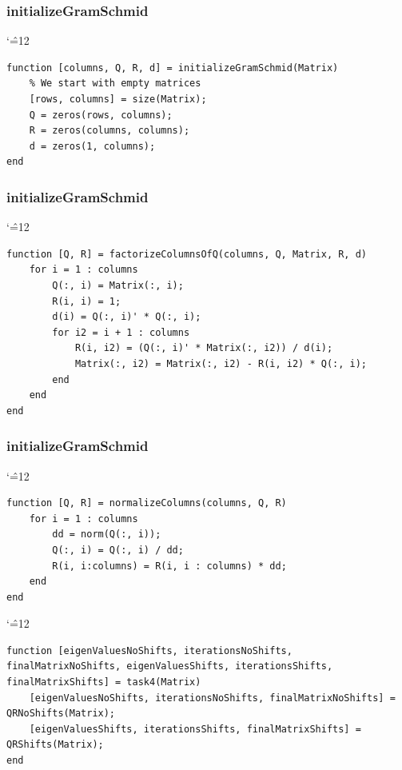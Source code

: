 \documentclass[12pt]{report}
\newenvironment{simplechar}{%
   \catcode`\^=12
}{}
\begin{document}
\subsubsection{initializeGramSchmid}
\begin{simplechar}
\begin{lstlisting}
function [columns, Q, R, d] = initializeGramSchmid(Matrix)
    % We start with empty matrices
    [rows, columns] = size(Matrix);
    Q = zeros(rows, columns);
    R = zeros(columns, columns);
    d = zeros(1, columns);
end
\end{lstlisting}
\end{simplechar}

\subsubsection{initializeGramSchmid}
\begin{simplechar}
\begin{lstlisting}
function [Q, R] = factorizeColumnsOfQ(columns, Q, Matrix, R, d)
    for i = 1 : columns
        Q(:, i) = Matrix(:, i);
        R(i, i) = 1;
        d(i) = Q(:, i)' * Q(:, i);
        for i2 = i + 1 : columns
            R(i, i2) = (Q(:, i)' * Matrix(:, i2)) / d(i);
            Matrix(:, i2) = Matrix(:, i2) - R(i, i2) * Q(:, i);
        end
    end
end
\end{lstlisting}
\end{simplechar}

\subsubsection{initializeGramSchmid}
\begin{simplechar}
\begin{lstlisting}
function [Q, R] = normalizeColumns(columns, Q, R)
    for i = 1 : columns
        dd = norm(Q(:, i));
        Q(:, i) = Q(:, i) / dd;
        R(i, i:columns) = R(i, i : columns) * dd;
    end
end
\end{lstlisting}
\end{simplechar}


\begin{simplechar}
\begin{lstlisting}
function [eigenValuesNoShifts, iterationsNoShifts, finalMatrixNoShifts, eigenValuesShifts, iterationsShifts, finalMatrixShifts] = task4(Matrix)
    [eigenValuesNoShifts, iterationsNoShifts, finalMatrixNoShifts] = QRNoShifts(Matrix);
    [eigenValuesShifts, iterationsShifts, finalMatrixShifts] = QRShifts(Matrix);
end
\end{lstlisting}
\end{simplechar}
\end{document}
